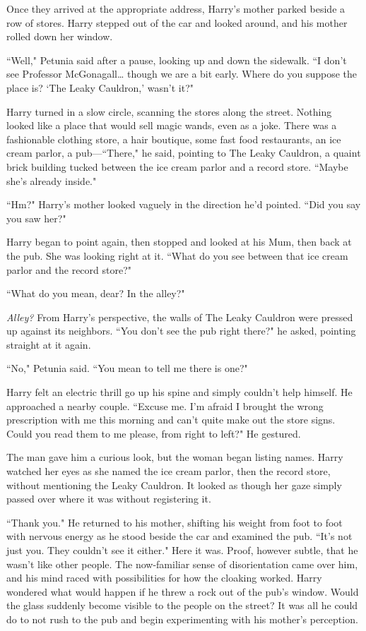 Once they arrived at the appropriate address, Harry's mother parked beside a row of stores. Harry stepped out of the car and looked around, and his mother rolled down her window.

``Well," Petunia said after a pause, looking up and down the sidewalk. ``I don't see Professor McGonagall{\ldots} though we are a bit early. Where do you suppose the place is? `The Leaky Cauldron,' wasn't it?"

Harry turned in a slow circle, scanning the stores along the street. Nothing looked like a place that would sell magic wands, even as a joke. There was a fashionable clothing store, a hair boutique, some fast food restaurants, an ice cream parlor, a pub---``There," he said, pointing to The Leaky Cauldron, a quaint brick building tucked between the ice cream parlor and a record store. ``Maybe she's already inside."

``Hm?" Harry's mother looked vaguely in the direction he'd pointed. ``Did you say you saw her?"

Harry began to point again, then stopped and looked at his Mum, then back at the pub. She was looking right at it. ``What do you see between that ice cream parlor and the record store?"

``What do you mean, dear? In the alley?"

\emph{Alley?} From Harry's perspective, the walls of The Leaky Cauldron were pressed up against its neighbors. ``You don't see the pub right there?" he asked, pointing straight at it again.

``No," Petunia said. ``You mean to tell me there is one?"

Harry felt an electric thrill go up his spine and simply couldn't help himself. He approached a nearby couple. ``Excuse me. I'm afraid I brought the wrong prescription with me this morning and can't quite make out the store signs. Could you read them to me please, from right to left?" He gestured.

The man gave him a curious look, but the woman began listing names. Harry watched her eyes as she named the ice cream parlor, then the record store, without mentioning the Leaky Cauldron. It looked as though her gaze simply passed over where it was without registering it.

``Thank you." He returned to his mother, shifting his weight from foot to foot with nervous energy as he stood beside the car and examined the pub. ``It's not just you. They couldn't see it either." Here it was. Proof, however subtle, that he wasn't like other people. The now-familiar sense of disorientation came over him, and his mind raced with possibilities for how the cloaking worked. Harry wondered what would happen if he threw a rock out of the pub's window. Would the glass suddenly become visible to the people on the street? It was all he could do to not rush to the pub and begin experimenting with his mother's perception.


